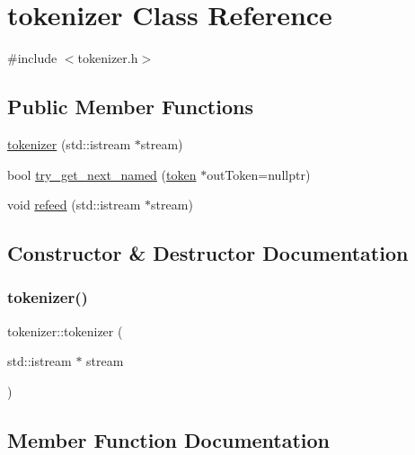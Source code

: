 \hypertarget{classtokenizer}{}\section{tokenizer Class Reference}
\label{classtokenizer}


{\ttfamily \#include $<$tokenizer.\+h$>$}

\subsection*{Public Member Functions}
\begin{DoxyCompactItemize}
\item 
\mbox{\hyperlink{classtokenizer_a0116d5da29a5a991ca2d16e7add75bea}{tokenizer}} (std\+::istream $\ast$stream)
\item 
bool \mbox{\hyperlink{classtokenizer_add70a1d3faf4a0ea659a6bbee8fa1a3f}{try\+\_\+get\+\_\+next\+\_\+named}} (\mbox{\hyperlink{classtoken}{token}} $\ast$out\+Token=nullptr)
\item 
void \mbox{\hyperlink{classtokenizer_a239449ec64a0d7b178d1a19b76cd860d}{refeed}} (std\+::istream $\ast$stream)
\end{DoxyCompactItemize}


\subsection{Constructor \& Destructor Documentation}
\mbox{\label{classtokenizer_a0116d5da29a5a991ca2d16e7add75bea}} 
\subsubsection{\texorpdfstring{tokenizer()}{tokenizer()}}
{\footnotesize\ttfamily tokenizer\+::tokenizer (\begin{DoxyParamCaption}\item[{std\+::istream $\ast$}]{stream }\end{DoxyParamCaption})\hspace{0.3cm}{\ttfamily [inline]}}



\subsection{Member Function Documentation}
\mbox{\label{classtokenizer_a239449ec64a0d7b178d1a19b76cd860d}} 
